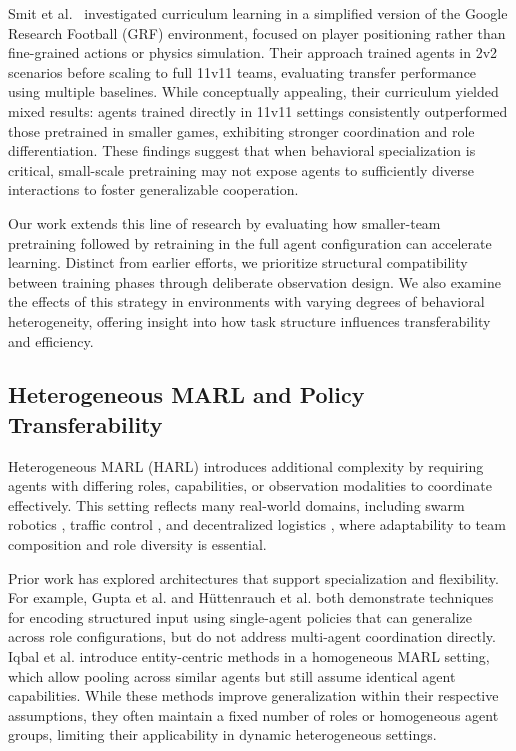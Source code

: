 \documentclass{article}
\begin{document}
Smit et al.\ \cite{smit2023} investigated curriculum learning in a simplified version of the 
Google Research Football (GRF) environment, focused on player positioning rather than 
fine-grained actions or physics simulation. Their approach trained agents in 2v2 scenarios 
before scaling to full 11v11 teams, evaluating transfer performance using multiple baselines. 
While conceptually appealing, their curriculum yielded mixed results: agents trained directly 
in 11v11 settings consistently outperformed those pretrained in smaller games, exhibiting 
stronger coordination and role differentiation. These findings suggest that when behavioral 
specialization is critical, small-scale pretraining may not expose agents to sufficiently 
diverse interactions to foster generalizable cooperation.

Our work extends this line of research by evaluating how smaller-team pretraining followed 
by retraining in the full agent configuration can accelerate learning. 
Distinct from earlier efforts, we prioritize structural compatibility between 
training phases through deliberate observation design. 
We also examine the effects of this strategy in environments with varying degrees of 
behavioral heterogeneity, offering insight into how task structure influences 
transferability and efficiency.

\subsection{Heterogeneous MARL and Policy Transferability}

Heterogeneous MARL (HARL) introduces additional complexity by requiring agents with differing
roles, capabilities, or observation modalities to coordinate effectively. This setting reflects
many real-world domains, including swarm robotics \cite{hoang2023}, traffic control \cite{calvo2018},
and decentralized logistics \cite{rizk2019}, where adaptability to team composition and role diversity
is essential.

Prior work has explored architectures that support specialization and flexibility. 
For example, Gupta et al. \cite{gupta2017a} and H{\"u}ttenrauch et al. \cite{huttenrauch2019} 
both demonstrate techniques for encoding structured input using single-agent policies that 
can generalize across role configurations, but do not address multi-agent coordination directly. 
Iqbal et al. \cite{iqbal2021} introduce entity-centric methods in a homogeneous MARL setting, 
which allow pooling across similar agents but still assume identical agent capabilities. 
While these methods improve generalization within their respective assumptions, they often 
maintain a fixed number of roles or homogeneous agent groups, limiting their applicability 
in dynamic heterogeneous settings.
\end{document}
